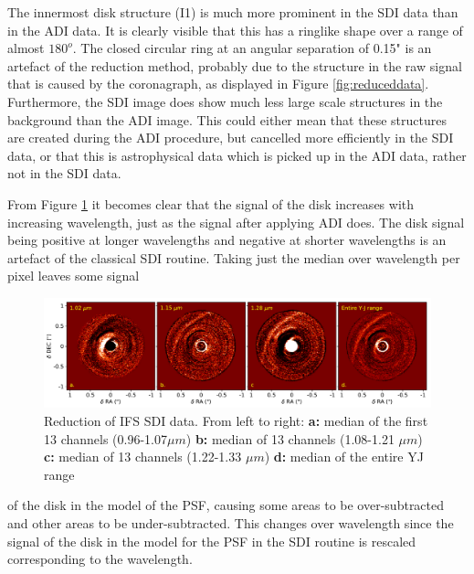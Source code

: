 \documentclass[twoside,single,12pt]{lion-msc}
\begin{document}
The innermost disk structure (I1) is much more prominent in the SDI data than in the ADI data. It is clearly visible that this has a ringlike shape over a range of almost $180^o$. The closed circular ring at an angular separation of 0.15" is an artefact of the reduction method, probably due to the structure in the raw signal that is caused by the coronagraph, as displayed in Figure \ref{fig:reduceddata}. Furthermore, the SDI image does show much less large scale structures in the background than the ADI image. This could either mean that these structures are created during the ADI procedure, but cancelled more efficiently in the SDI data, or that this is astrophysical data which is picked up in the ADI data, rather not in the SDI data.
\bigskip

From Figure \ref{fig:SDIcolor} it becomes clear that the signal of the disk increases with increasing wavelength, just as the signal after applying ADI does. The disk signal being positive at longer wavelengths and negative at shorter wavelengths is an artefact of the classical SDI routine. Taking just the median over wavelength per pixel leaves some signal {\par}

\begin{figure}[htb]
\centering
\includegraphics[trim={0cm 0cm 0cm 0cm},clip,width = 1.01\textwidth]{SDIwavelplot}
\caption{Reduction of IFS SDI data. From left to right: \textbf{a:} median of the first 13 channels (0.96-1.07$\mu m$) \textbf{b:} median of 13 channels (1.08-1.21 $\mu m$) \textbf{c:} median of 13 channels (1.22-1.33 $\mu m$) \textbf{d:} median of the entire YJ range}
\label{fig:SDIcolor}
\end{figure}

\noindent
 of the disk in the model of the PSF, causing some areas to be over-subtracted and other areas to be under-subtracted. This changes over wavelength since the signal of the disk in the model for the PSF in the SDI routine is rescaled corresponding to the wavelength.
\clearpage
\end{document}
